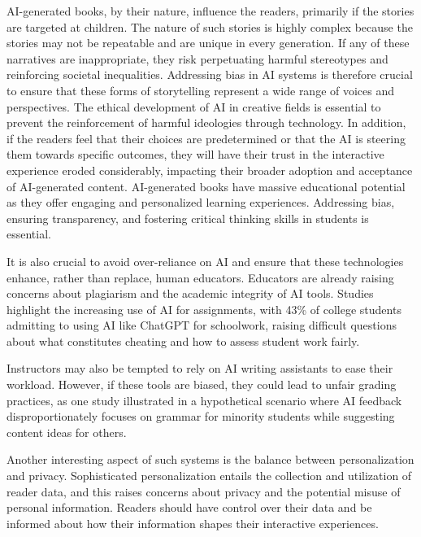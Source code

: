 \documentclass[conference]{IEEEtran}
\begin{document}
	AI-generated books, by their nature, influence the readers, primarily if the stories are targeted at children\cite{salazar2024generative}. The nature of such stories is highly complex because the stories may not be repeatable and are unique in every generation.   If any of these narratives are inappropriate, they risk perpetuating harmful stereotypes and reinforcing societal inequalities. Addressing bias in AI systems is therefore crucial to ensure that these forms of storytelling represent a wide range of voices and perspectives. The ethical development of AI in creative fields is essential to prevent the reinforcement of harmful ideologies through technology. In addition, if the readers feel that their choices are predetermined or that the AI is steering them towards specific outcomes, they will have their trust in the interactive experience eroded considerably, impacting their broader adoption and acceptance of AI-generated content. AI-generated books have massive educational potential as they offer engaging and personalized learning experiences. Addressing bias, ensuring transparency, and fostering critical thinking skills in students is essential. 
	
	It is also crucial to avoid over-reliance on AI and ensure that these technologies enhance, rather than replace, human educators\cite{salazar2024generative}. Educators are already raising concerns about plagiarism and the academic integrity of AI tools. Studies\cite{delello2023exploring} highlight the increasing use of AI for assignments, with 43\% of college students admitting to using AI like ChatGPT for schoolwork, raising difficult questions about what constitutes cheating and how to assess student work fairly.
	
	Instructors may also be tempted to rely on AI writing assistants to ease their workload. However, if these tools are biased, they could lead to unfair grading practices, as one study illustrated in a hypothetical scenario where AI feedback disproportionately focuses on grammar for minority students while suggesting content ideas for others\cite{salazar2024generative}.
	
	Another interesting aspect of such systems is the balance between personalization and privacy\cite{kutty2021personalization}. Sophisticated personalization entails the collection and utilization of reader data, and this raises concerns about privacy and the potential misuse of personal information. Readers should have control over their data and be informed about how their information shapes their interactive experiences.
	
\end{document}
